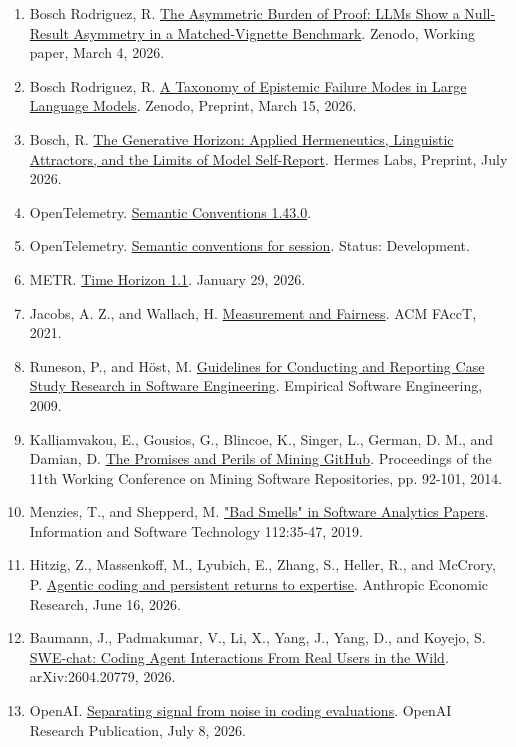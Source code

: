 \documentclass[12pt]{article}
\providecommand{\tightlist}{%
  \setlength{\itemsep}{0pt}\setlength{\parskip}{0pt}}
\begin{document}
\begin{enumerate}
\def\labelenumi{\arabic{enumi}.}
\tightlist
\item
  Bosch Rodriguez, R. \href{https://doi.org/10.5281/zenodo.18867694}{The Asymmetric Burden of Proof: LLMs Show a Null-Result Asymmetry in a Matched-Vignette Benchmark}. Zenodo, Working paper, March 4, 2026.
\item
  Bosch Rodriguez, R. \href{https://doi.org/10.5281/zenodo.19042469}{A Taxonomy of Epistemic Failure Modes in Large Language Models}. Zenodo, Preprint, March 15, 2026.
\item
  Bosch, R. \href{https://doi.org/10.5281/zenodo.21659634}{The Generative Horizon: Applied Hermeneutics, Linguistic Attractors, and the Limits of Model Self-Report}. Hermes Labs, Preprint, July 2026.
\item
  OpenTelemetry. \href{https://opentelemetry.io/docs/specs/semconv/}{Semantic Conventions 1.43.0}.
\item
  OpenTelemetry. \href{https://opentelemetry.io/docs/specs/semconv/general/session/}{Semantic conventions for session}. Status: Development.
\item
  METR. \href{https://metr.org/blog/2026-1-29-time-horizon-1-1/}{Time Horizon 1.1}. January 29, 2026.
\item
  Jacobs, A. Z., and Wallach, H. \href{https://doi.org/10.1145/3442188.3445901}{Measurement and Fairness}. ACM FAccT, 2021.
\item
  Runeson, P., and Höst, M. \href{https://doi.org/10.1007/s10664-008-9102-8}{Guidelines for Conducting and Reporting Case Study Research in Software Engineering}. Empirical Software Engineering, 2009.
\item
  Kalliamvakou, E., Gousios, G., Blincoe, K., Singer, L., German, D. M., and Damian, D. \href{https://doi.org/10.1145/2597073.2597074}{The Promises and Perils of Mining GitHub}. Proceedings of the 11th Working Conference on Mining Software Repositories, pp. 92-101, 2014.
\item
  Menzies, T., and Shepperd, M. \href{https://doi.org/10.1016/j.infsof.2019.04.005}{"Bad Smells" in Software Analytics Papers}. Information and Software Technology 112:35-47, 2019.
\item
  Hitzig, Z., Massenkoff, M., Lyubich, E., Zhang, S., Heller, R., and McCrory, P. \href{https://www.anthropic.com/research/claude-code-expertise}{Agentic coding and persistent returns to expertise}. Anthropic Economic Research, June 16, 2026.
\item
  Baumann, J., Padmakumar, V., Li, X., Yang, J., Yang, D., and Koyejo, S. \href{https://arxiv.org/abs/2604.20779}{SWE-chat: Coding Agent Interactions From Real Users in the Wild}. arXiv:2604.20779, 2026.
\item
  OpenAI. \href{https://openai.com/index/separating-signal-from-noise-coding-evaluations/}{Separating signal from noise in coding evaluations}. OpenAI Research Publication, July 8, 2026.
\end{enumerate}
\end{document}
